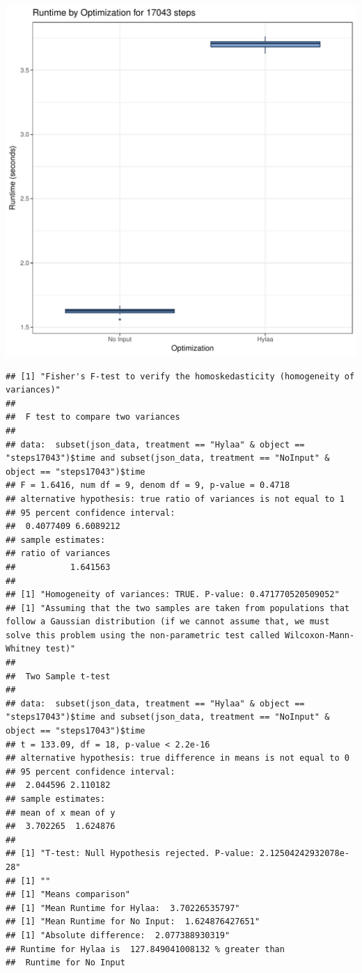 \documentclass{article}\usepackage[]{graphicx}\usepackage[]{color}
\makeatletter
\def\maxwidth{ %
  \ifdim\Gin@nat@width>\linewidth
    \linewidth
  \else
    \Gin@nat@width
  \fi
}
\newenvironment{kframe}{%
 \def\at@end@of@kframe{}%
 \ifinner\ifhmode%
  \def\at@end@of@kframe{\end{minipage}}%
  \begin{minipage}{\columnwidth}%
 \fi\fi%
 \def\FrameCommand##1{\hskip\@totalleftmargin \hskip-\fboxsep
 \colorbox{shadecolor}{##1}\hskip-\fboxsep
     \hskip-\linewidth \hskip-\@totalleftmargin \hskip\columnwidth}%
 \MakeFramed {\advance\hsize-\width
   \@totalleftmargin\z@ \linewidth\hsize
   \@setminipage}}%
 {\par\unskip\endMakeFramed%
 \at@end@of@kframe}
\newenvironment{knitrout}{}{} %
\makeatother
\begin{document}
\begin{knitrout}
\color{fgcolor}
\includegraphics[width=\maxwidth]{figure/RH4_steps17043-1} 
\begin{kframe}\begin{verbatim}
## [1] "Fisher's F-test to verify the homoskedasticity (homogeneity of variances)"
## 
## 	F test to compare two variances
## 
## data:  subset(json_data, treatment == "Hylaa" & object == "steps17043")$time and subset(json_data, treatment == "NoInput" & object == "steps17043")$time
## F = 1.6416, num df = 9, denom df = 9, p-value = 0.4718
## alternative hypothesis: true ratio of variances is not equal to 1
## 95 percent confidence interval:
##  0.4077409 6.6089212
## sample estimates:
## ratio of variances 
##           1.641563 
## 
## [1] "Homogeneity of variances: TRUE. P-value: 0.471770520509052"
## [1] "Assuming that the two samples are taken from populations that follow a Gaussian distribution (if we cannot assume that, we must solve this problem using the non-parametric test called Wilcoxon-Mann-Whitney test)"
## 
## 	Two Sample t-test
## 
## data:  subset(json_data, treatment == "Hylaa" & object == "steps17043")$time and subset(json_data, treatment == "NoInput" & object == "steps17043")$time
## t = 133.09, df = 18, p-value < 2.2e-16
## alternative hypothesis: true difference in means is not equal to 0
## 95 percent confidence interval:
##  2.044596 2.110182
## sample estimates:
## mean of x mean of y 
##  3.702265  1.624876 
## 
## [1] "T-test: Null Hypothesis rejected. P-value: 2.12504242932078e-28"
## [1] ""
## [1] "Means comparison"
## [1] "Mean Runtime for Hylaa:  3.70226535797"
## [1] "Mean Runtime for No Input:  1.624876427651"
## [1] "Absolute difference:  2.077388930319"
## Runtime for Hylaa is  127.849041008132 % greater than 
##  Runtime for No Input
\end{verbatim}
\end{kframe}
\end{knitrout}
\end{document}
